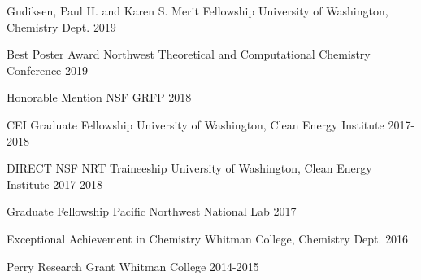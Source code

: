 



\begin{cvhonors}


\cvhonor
{Gudiksen, Paul H. and Karen S. Merit Fellowship}%
{University of Washington, Chemistry Dept.} %
{} %
{2019} %


\cvhonor
{Best Poster Award}%
{Northwest Theoretical and Computational Chemistry Conference} %
{} %
{2019} %


\cvhonor
{Honorable Mention}%
{NSF GRFP} %
{} %
{2018} %


\cvhonor
{CEI Graduate Fellowship}%
{University of Washington, Clean Energy Institute} %
{} %
{2017-2018} %


\cvhonor
{DIRECT NSF NRT Traineeship}%
{University of Washington, Clean Energy Institute} %
{} %
{2017-2018} %


\cvhonor
{Graduate Fellowship} %
{Pacific Northwest National Lab}%
{} %
{2017} %


\cvhonor
{Exceptional Achievement in Chemistry}%
{Whitman College, Chemistry Dept.} %
{} %
{2016} %


\cvhonor
{Perry Research Grant} %
{Whitman College} %
{} %
{2014-2015} %


\end{cvhonors}
\vspace{-1cm}
